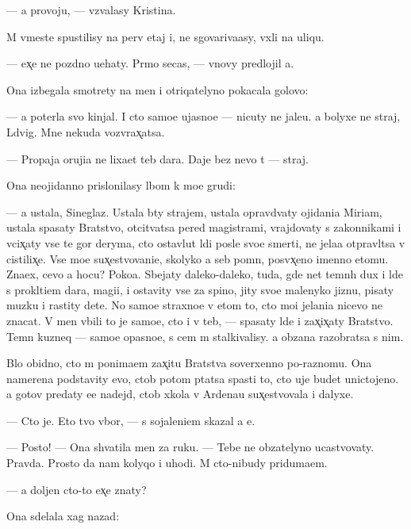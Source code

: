 \documentclass[10pt]{book}
\begin{document}
— {\Y}a provoju, — v{\yi}zvalasy Kristina.

M{\yi} vmeste spustilisy na perv{\yi}{\y} etaj i, ne sgovariva{\y}asy, v{\yi}xli na uliqu.

— {\Y}ex̨e ne pozdno u{\y}ehaty. Pr{\ia}mo se{\y}cas, — vnovy predlojil {\y}a.

Ona izbegala smotrety na men{\ia} i otriqatelyno pokacala golovo{\y}:

— {\Y}a poter{\ia}la svo{\y} kinjal. I cto samo{\y}e ujasno{\y}e — nicuty ne jale{\y}u. {\Y}a bolyxe ne straj, L{\iu}dvig. Mne nekuda vozvrax̨atsa.

— Propaja oruji{\y}a ne lixa{\y}et teb{\ia} dara. Daje bez nevo t{\yi} — straj.

Ona neojidanno prislonilasy lbom k mo{\y}e{\y} grudi:

— {\Y}a ustala, Sineglaz{\yi}{\y}. Ustala b{\yi}ty strajem, ustala opravd{\yi}vaty ojidani{\y}a Miriam, ustala spasaty Bratstvo, otcit{\yi}vatsa pered magistrami, vrajdovaty s zakonnikami i v{\yi}cix̨aty vse te gor{\yi} deryma, cto ostavl{\ia}{\y}ut l{\iu}di posle svo{\y}e{\y} smerti, ne jela{\y}a otpravl{\ia}tsa v cistilix̨e. Vse mo{\y}e sux̨estvovani{\y}e, skolyko {\y}a seb{\ia} pomn{\iu}, posv{\ia}x̨eno imenno etomu. Zna{\y}ex, cevo {\y}a hocu? Poko{\y}a. Sbejaty daleko-daleko, tuda, gde net temn{\yi}h dux i l{\iu}de{\y} s prokl{\ia}ti{\y}em dara, magi{\y}i, i ostavity vse za spino{\y}, jity svo{\y}e{\y} malenyko{\y} jizn{\y}u, pisaty muz{\yi}ku i rastity dete{\y}. No samo{\y}e straxno{\y}e v etom to, cto mo{\y}i jelani{\y}a nicevo ne znacat. V men{\ia} vbili to je samo{\y}e, cto i v teb{\ia}, — spasaty l{\iu}de{\y} i zax̨ix̨aty Bratstvo. Temn{\yi}{\y} kuzneq — samo{\y}e opasno{\y}e, s cem m{\yi} stalkivalisy. {\Y}a ob{\ia}zana razobratsa s nim.

B{\yi}lo obidno, cto m{\yi} ponima{\y}em zax̨itu Bratstva soverxenno po-raznomu. Ona namerena podstavity {\y}evo, ctob{\yi} potom p{\yi}tatsa spasti to, cto uje budet unictojeno. {\Y}a gotov predaty {\y}e{\y}e nadejd{\yi}, ctob{\yi} xkola v Ardenau sux̨estvovala i dalyxe.

— Cto je. Eto tvo{\y} v{\yi}bor, — s sojaleni{\y}em skazal {\y}a {\y}e{\y}.

— Posto{\y}! — Ona shvatila men{\ia} za ruku. — Tebe ne ob{\ia}zatelyno ucastvovaty. Pravda. Prosto da{\y} nam kolyqo i uhodi. M{\yi} cto-nibudy priduma{\y}em.

— {\Y}a doljen cto-to {\y}ex̨e znaty?

Ona sdelala xag nazad:
\end{document}
